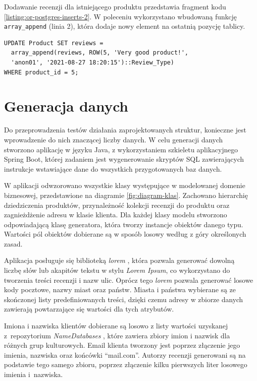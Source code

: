 \documentclass[a4paper,twoside,12pt]{book}
\begin{document}
\vspace{0.1cm}

Dodawanie recenzji dla istniejącego produktu przedstawia fragment kodu \ref{listing:or-postgres-inserts-2}. W poleceniu wykorzystano wbudowaną funkcję \lstinline{array_append} (linia 2), która dodaje nowy element na ostatnią pozycję tablicy. 

\vspace{0.1cm}

\begin{lstlisting}[style=SQL, caption={Tworzenie typu i tabeli zakupów w Postgres.}, label={listing:or-postgres-inserts-2}, captionpos=b]
UPDATE Product SET reviews = 
  array_append(reviews, ROW(5, 'Very good product!',
  'anon01', '2021-08-27 18:20:15')::Review_Type)
WHERE product_id = 5;
\end{lstlisting}

\section{Generacja danych}

Do przeprowadzenia testów działania zaprojektowanych struktur, konieczne jest wprowadzenie do nich znaczącej liczby danych. W celu generacji danych stworzono aplikację w języku Java, z wykorzystaniem szkieletu aplikacyjnego Spring Boot, której zadaniem jest wygenerowanie skryptów SQL zawierających instrukcje wstawiające dane do wszystkich przygotowanych baz danych.
 
W aplikacji odwzorowano wszystkie klasy występujące w modelowanej domenie biznesowej, przedstawione na diagramie \ref{fig:diagram-klas}. Zachowano hierarchię dziedziczenia produktów, przynależność kolekcji recenzji do produktu oraz zagnieżdżenie adresu w klasie klienta. Dla każdej klasy modelu stworzono odpowiadającą klasę generatora, która tworzy instancje obiektów danego typu. Wartości pól obiektów dobierane są w sposób losowy według z góry określonych zasad.

Aplikacja posługuje się biblioteką \textit{lorem} \cite{bib:github-lorem}, która pozwala generować dowolną liczbę słów lub akapitów tekstu w stylu \textit{Lorem Ipsum}, co wykorzystano do tworzenia treści recenzji i nazw ulic. Oprócz tego \textit{lorem} pozwala generować losowe kody pocztowe, nazwy miast oraz państw. Miasta i państwa wybierane są ze skończonej listy predefiniowanych treści, dzięki czemu adresy w zbiorze danych zawierają powtarzające się wartości dla tych atrybutów.

Imiona i nazwiska klientów dobierane są losowo z listy wartości uzyskanej z~repozytorium \textit{NameDatabases} \cite{bib:github-names}, które zawiera zbiory imion i nazwisk dla różnych grup kulturowych. Email klienta tworzony jest poprzez złączenie jego imienia, nazwiska oraz końcówki ``mail.com''. Autorzy recenzji generowani są na podstawie tego samego zbioru, poprzez złączenie kilku pierwszych liter losowego imienia i~nazwiska. 
\end{document}
